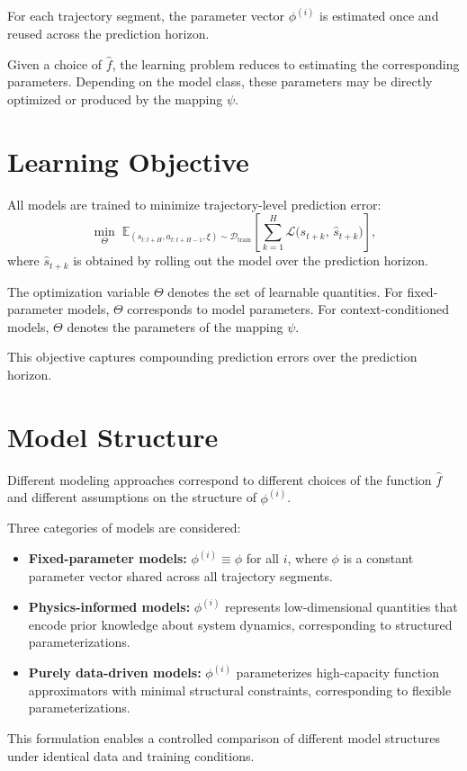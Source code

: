 For each trajectory segment, the parameter vector $\phi^{(i)}$ is estimated once and reused across the prediction horizon.

Given a choice of $\hat{f}$, the learning problem reduces to estimating the corresponding parameters. Depending on the model class, these parameters may be directly optimized or produced by the mapping $\psi$.

\section{Learning Objective}

All models are trained to minimize trajectory-level prediction error:
\begin{equation}
  \min_{\Theta} \;
  \mathbb{E}_{(s_{t:t+H}, a_{t:t+H-1}, \xi) \sim \mathcal{D}_{\text{train}}}
  \left[
    \sum_{k=1}^{H}
    \mathcal{L}\big(
      s_{t+k},\,
      \hat{s}_{t+k}
    \big)
  \right],
\end{equation}
where $\hat{s}_{t+k}$ is obtained by rolling out the model over the prediction horizon.

The optimization variable $\Theta$ denotes the set of learnable quantities. For fixed-parameter models, $\Theta$ corresponds to model parameters. For context-conditioned models, $\Theta$ denotes the parameters of the mapping $\psi$.

This objective captures compounding prediction errors over the prediction horizon.

\section{Model Structure}

Different modeling approaches correspond to different choices of the function $\hat{f}$ and different assumptions on the structure of $\phi^{(i)}$.

Three categories of models are considered:

\begin{itemize}
\item \textbf{Fixed-parameter models:} $\phi^{(i)} \equiv \phi$ for all $i$, where $\phi$ is a constant parameter vector shared across all trajectory segments.

\item \textbf{Physics-informed models:} $\phi^{(i)}$ represents low-dimensional quantities that encode prior knowledge about system dynamics, corresponding to structured parameterizations.

\item \textbf{Purely data-driven models:} $\phi^{(i)}$ parameterizes high-capacity function approximators with minimal structural constraints, corresponding to flexible parameterizations.
\end{itemize}

This formulation enables a controlled comparison of different model structures under identical data and training conditions.